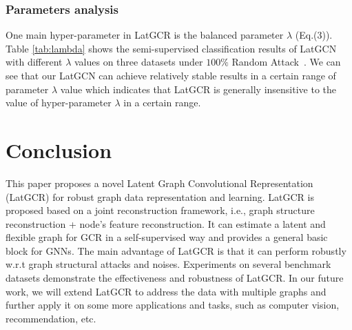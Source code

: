 \documentclass{article}
\begin{document}
\subsubsection{Parameters analysis}

One main hyper-parameter in LatGCR is the balanced parameter $\lambda$ (Eq.(3)).
Table \ref{tab:lambda} shows the semi-supervised classification results of LatGCN with different $\lambda$ values on three datasets under $100\%$ Random Attack~\cite{jin2020adversarial}.
We can see that our LatGCN can achieve relatively stable results in a certain range of parameter $\lambda$ value which indicates that LatGCR is generally insensitive to the value of hyper-parameter $\lambda$ in a certain range.



\section{Conclusion}

This paper proposes a novel Latent Graph Convolutional Representation (LatGCR) for robust graph data representation and learning.
LatGCR is proposed based on a joint reconstruction framework, i.e., graph structure reconstruction + node's feature reconstruction.
 It  can estimate a latent and flexible graph for GCR in a self-supervised way and provides a general basic block for GNNs.
The main advantage of LatGCR is that it can perform robustly w.r.t graph structural attacks and noises.
Experiments on several benchmark datasets demonstrate the effectiveness and robustness of LatGCR.
In our future work, we will extend LatGCR to address the data with multiple graphs and further apply it on some more applications and tasks, such as computer vision, recommendation, etc.
\end{document}
